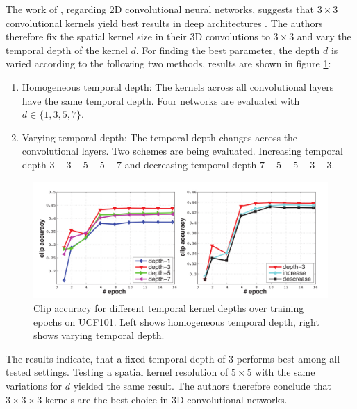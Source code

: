 The work of \textcite{simonyan_very_2014}, regarding 2D convolutional neural networks, suggests that $3\times3$ convolutional kernels yield best results in deep architectures .
The authors therefore fix the spatial kernel size in their 3D convolutions to $3\times3$ and vary the temporal depth of the kernel $d$.
For finding the best parameter, the depth $d$ is varied according to the following two methods, results are shown in figure \ref{fig:c3d_temporaldeptheval}:
\begin{enumerate}
    \item Homogeneous temporal depth: The kernels across all convolutional layers have the same temporal depth. Four networks are evaluated with $d \in \{1, 3, 5, 7\}$.
    \item Varying temporal depth: The temporal depth changes across the convolutional layers. Two schemes are being evaluated. Increasing temporal depth $3-3-5-5-7$ and decreasing temporal depth $7-5-5-3-3$.
\end{enumerate}

\begin{figure}[H]
    \centering
    \includegraphics[width=\textwidth]{img_deep/c3d_temporaldeptheval}
    \caption{Clip accuracy for different temporal kernel depths over training epochs on UCF101. Left shows homogeneous temporal depth, right shows varying temporal depth. \cite{tran_learning_2015}}
    \label{fig:c3d_temporaldeptheval}
\end{figure}

The results indicate, that a fixed temporal depth of 3 performs best among all tested settings.
Testing a spatial kernel resolution of $5\times5$ with the same variations for $d$ yielded the same result.
The authors therefore conclude that $3\times3\times3$ kernels are the best choice in 3D convolutional networks.

